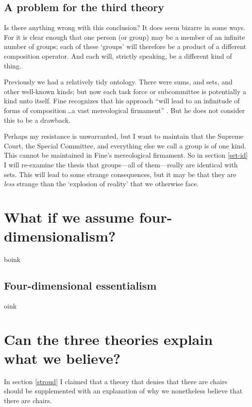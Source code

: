 \documentclass[11pt]{article}
\begin{document}
\begin{spacing}{1.5}
\subsection{A problem for the third theory}
\label{problem3}
Is there anything wrong with this conclusion?  It does seem bizarre in
some ways.  For it is clear enough that one person (or group) may be a
member of an infinite number of groups; each of these `groups' will
therefore be a product of a different composition operator.  And each
will, strictly speaking, be a different kind of thing.

Previously we had a relatively tidy ontology.  There were sums, and
sets, and other well-known kinds; but now each task force or
subcommittee is potentially a kind unto itself.  Fine recognizes that
his approach ``will lead to an infinitude of forms of
composition\,\ldots a vast mereological firmament''
\citeyearpar[576]{fine2010}.  But he does not consider this to be a
drawback.

Perhaps my resistance is unwarranted, but I want to maintain that the
Supreme Court, the Special Committee, and everything else we call a
group is of one kind.  This cannot be maintained in Fine's
mereological firmament.  So in section \ref{set-id} I will re-examine
the thesis that groups---all of them---really are identical with sets.
This will lead to some strange consequences, but it may be that they
are {\em less} strange than the `explosion of reality' that we
otherwise face.

\section{What if we assume four-dimensionalism?}
\label{4d}
boink

\subsection{Four-dimensional essentialism}
\label{4de}
oink



\section{Can the three theories explain what we believe?}
\label{explain-p}
In section \ref{stroud} I claimed that a theory that denies that there
are chairs should be supplemented with an explanation of why we
nonetheless believe that there are chairs.


\end{spacing}
\end{document}
